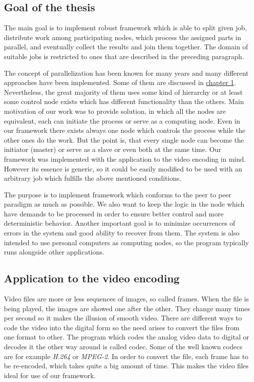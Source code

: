 \subsection*{Goal of the thesis} %
The main goal is to implement robust framework which is able to split given job, distribute work among participating nodes, which process the assigned parts in parallel, and eventually collect the results and join them together. The domain of suitable jobs is restricted to ones that are described in the preceding paragraph.

The concept of parallelization has been known for many years and many different approaches have been implemented. Some of them are discussed in \hyperref[existing-solutions]{chapter 1}. Nevertheless, the great majority of them uses some kind of hierarchy or at least some control node exists which has different functionality than the others. Main motivation of our work was to provide solution, in which all the nodes are equivalent, each can initiate the process or serve as a computing node. Even in our framework there exists always one node which controls the process while the other ones do the work. But the point is, that every single node can become the initiator (master) or serve as a slave or even both at the same time. Our framework was implemented with the application to the video encoding in mind. However its essence is generic, so it could be easily modified to be used with an arbitrary job which fulfills the above mentioned conditions.

The purpose is to implement framework which conforms to the peer to peer paradigm as much as possible. We also want to keep the logic in the node which have demands to be processed in order to ensure better control and more deterministic behavior. Another important goal is to minimize occurrences of errors in the system and good ability to recover from them. The system is also intended to use personal computers as computing nodes, so the program typically runs alongside other applications.


\subsection*{Application to the video encoding}
Video files are more or less sequences of images, so called frames. When the file is being played, the images are showed one after the other. They change many times per second so it makes the illusion of smooth video. There are different ways to code the video into the digital form so the need arises to convert the files from one format to other. The program which codes the analog video data to digital or decodes it the other way around is called codec. Some of the well known codecs are for example \textit{H.264} or \textit{MPEG-2}. In order to convert the file, each frame has to be re-encoded, which takes quite a big amount of time. This makes the video files ideal for use of our framework.


